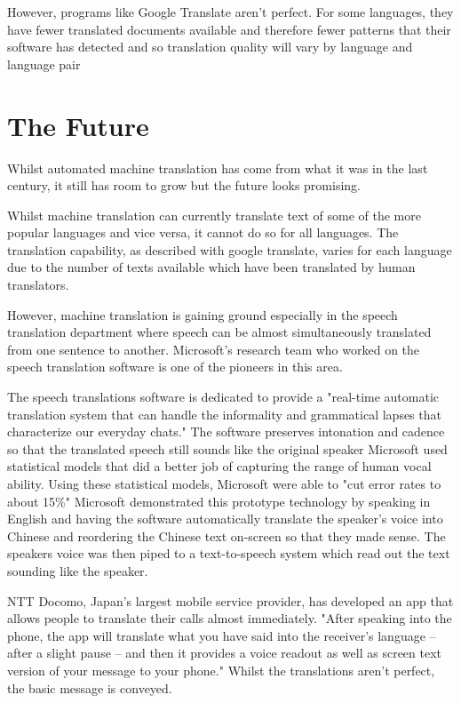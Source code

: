 \documentclass[12pt,a4paper]{article}
\begin{document}
However, programs like Google Translate aren’t perfect. 
For some languages, they have fewer translated documents available and therefore fewer patterns that their software has detected and so translation quality will vary by language and language pair

\newpage

\section{The Future}
Whilst automated machine translation has come from  what it was in the last century, it still has room to grow but the future looks promising. 

Whilst machine translation can currently translate text of some of the more popular languages and vice versa, it cannot do so for all languages. The translation capability, as described with google translate, varies for each language due to the number of texts available which have been translated by human translators.

However, machine translation is gaining ground especially in the speech translation department where speech can be almost simultaneously translated from one sentence to another. Microsoft's research team who worked on the speech translation software is one of the pioneers in this area.

The speech translations software is dedicated to provide a "real-time automatic translation system that can handle the informality and grammatical lapses that characterize our everyday chats."\cite{Microsoft Speech Software}
The software preserves intonation and cadence so that the translated speech still sounds like the original speaker
Microsoft used statistical models that did a better job of capturing the range of human vocal ability. 
Using these statistical models, Microsoft were able to "cut error rates to about 15\%"\cite{BBC News Article}
Microsoft demonstrated this prototype technology by speaking in English and having the software automatically translate
the speaker's voice into Chinese and reordering the Chinese text on-screen so that they made sense. The speakers voice was then piped to a text-to-speech system which read out the text sounding like the speaker. 

NTT Docomo, Japan's largest mobile service provider, has developed an app that allows people to translate their calls almost immediately. "After speaking into the phone, the app will translate what you have said into the receiver's language -- after a slight pause -- and then it provides a voice readout as well as screen text version of your message to your phone."\cite{CNN Article}
Whilst the translations aren't perfect, the basic message is conveyed.
\end{document}
